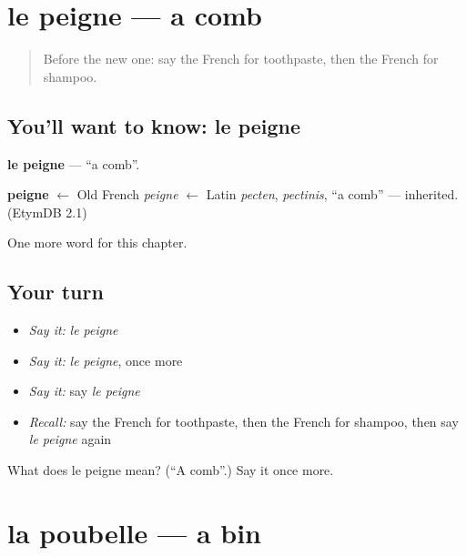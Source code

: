 \section[le peigne]{le peigne — a comb}

\label{lesson:FR-C114-peigne}



\begin{quote}
Before the new one: say the French for toothpaste, then the French for shampoo.
\end{quote}

\subsection*{You'll want to know: le peigne}
\textbf{le peigne} — \textquotedblleft{}a comb\textquotedblright{}.

\begin{cousinweb}
\textbf{peigne} $\leftarrow$ Old French \emph{peigne} $\leftarrow$ Latin \emph{pecten}, \emph{pectinis}, \textquotedblleft{}a comb\textquotedblright{} — inherited. (EtymDB 2.1)
\end{cousinweb}

\begin{grammarlens}[title={What you've built}]
One more word for this chapter.
\end{grammarlens}

\subsection*{Your turn}
\begin{itemize}
\raggedright
  \item \emph{Say it:} \emph{le peigne}
  \item \emph{Say it:} \emph{le peigne}, once more
  \item \emph{Say it:} say \emph{le peigne}
  \item \emph{Recall:} say the French for toothpaste, then the French for shampoo, then say \emph{le peigne} again
\end{itemize}

\begin{tcolorbox}[breakable,colback=teal!4,colframe=teal!35!black,title={Before you move on}]
What does le peigne mean? (\textquotedblleft{}A comb\textquotedblright{}.) Say it once more.
\end{tcolorbox}
\section[la poubelle]{la poubelle — a bin}

